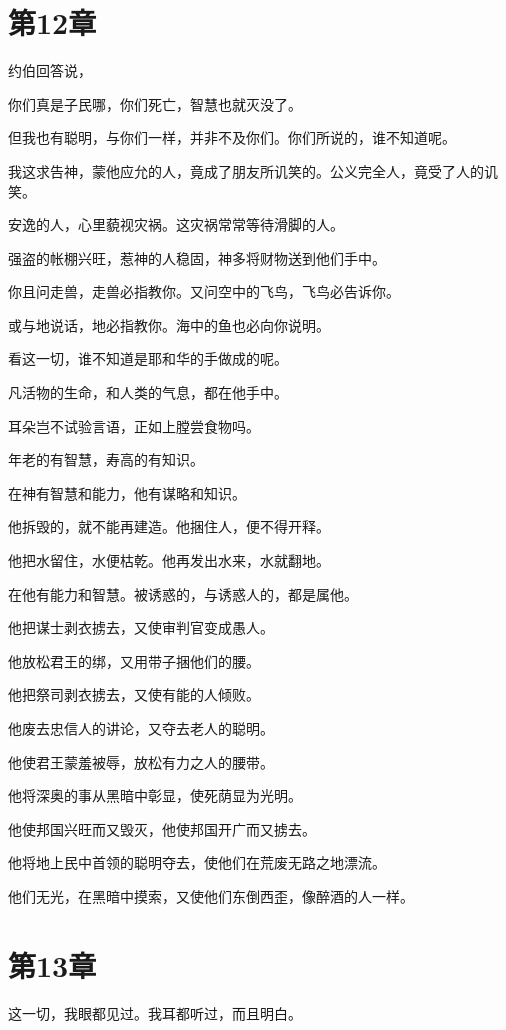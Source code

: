 \documentclass[12pt,oneside]{book}
\begin{document}
\chapter{第12章}
约伯回答说，

你们真是子民哪，你们死亡，智慧也就灭没了。

但我也有聪明，与你们一样，并非不及你们。你们所说的，谁不知道呢。

我这求告神，蒙他应允的人，竟成了朋友所讥笑的。公义完全人，竟受了人的讥笑。

安逸的人，心里藐视灾祸。这灾祸常常等待滑脚的人。

强盗的帐棚兴旺，惹神的人稳固，神多将财物送到他们手中。

你且问走兽，走兽必指教你。又问空中的飞鸟，飞鸟必告诉你。

或与地说话，地必指教你。海中的鱼也必向你说明。

看这一切，谁不知道是耶和华的手做成的呢。

凡活物的生命，和人类的气息，都在他手中。

耳朵岂不试验言语，正如上膛尝食物吗。

年老的有智慧，寿高的有知识。

在神有智慧和能力，他有谋略和知识。

他拆毁的，就不能再建造。他捆住人，便不得开释。

他把水留住，水便枯乾。他再发出水来，水就翻地。

在他有能力和智慧。被诱惑的，与诱惑人的，都是属他。

他把谋士剥衣掳去，又使审判官变成愚人。

他放松君王的绑，又用带子捆他们的腰。

他把祭司剥衣掳去，又使有能的人倾败。

他废去忠信人的讲论，又夺去老人的聪明。

他使君王蒙羞被辱，放松有力之人的腰带。

他将深奥的事从黑暗中彰显，使死荫显为光明。

他使邦国兴旺而又毁灭，他使邦国开广而又掳去。

他将地上民中首领的聪明夺去，使他们在荒废无路之地漂流。

他们无光，在黑暗中摸索，又使他们东倒西歪，像醉酒的人一样。



\chapter{第13章}
这一切，我眼都见过。我耳都听过，而且明白。
\end{document}
